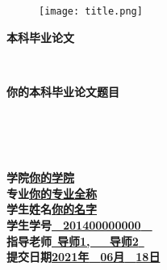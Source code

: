\thispagestyle{empty}
\begin{figure}[ht]
\centering
\texttt{[image: title.png]}
\end{figure}
\begin{center}
\textbf{本科毕业论文}
\end{center}
\nopagebreak[4]
\begin{center}
\ \\
\end{center}
\nopagebreak[4]
\begin{center}
\textbf{你的本科毕业论文题目}
\end{center}
\nopagebreak[4]
\begin{center}
\ \\\ \\\ \\
\end{center}
\nopagebreak[4]
\begin{spacing}{1.8}
\begin{center}
\textbf{学\quad\quad 院}\quad\underline{\quad\quad\quad\quad\textbf{你的学院}\quad\quad\quad\quad}\\
\textbf{专\quad\quad 业}\quad\underline{\quad\quad\quad\textbf{你的专业全称}\quad\quad\quad}\\
\textbf{学生姓名}\quad\underline{\quad\quad\quad\quad\textbf{你的名字}\quad\quad\quad\quad}\\
\textbf{学生学号}\quad\underline{\quad\quad\ \ \textbf{201400000000}\ \ \quad\quad}\\
\textbf{指导老师}\quad\underline{\quad\quad\ \textbf{导师1,\ \ \ 导师2}\ \quad\quad}\\
\textbf{提交日期}\quad\underline{\quad\textbf{2021年}\ \ \textbf{06月}\ \ \textbf{18日}\quad}
\end{center}
\end{spacing}
\pagebreak[4]
